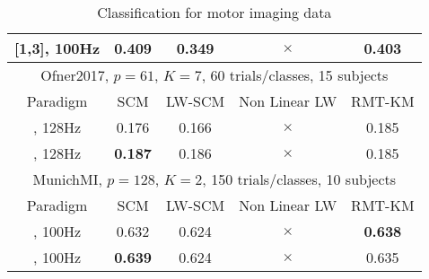 \begin{table*}[]
\begin{tabular}{||c||c|c|c|c||}
    [1,3], 100Hz & {\bf 0.409} & 0.349 & $\times$ & 0.403 \\
    \hline
    \hline
    \multicolumn{5}{|c|}{Ofner2017, $p=61$, $K=7$, 60 trials/classes, 15 subjects} \\
    \hline
    Paradigm & SCM & LW-SCM & Non Linear LW & RMT-KM \\
    \hline
    [0,3], 128Hz & 0.176 & 0.166 & $\times$ & 0.185 \\
    \hline
    [1,2], 128Hz & {\bf 0.187} & 0.186 & $\times$ & 0.185 \\
    \hline
    \hline
    \multicolumn{5}{|c|}{MunichMI, $p=128$, $K=2$, 150 trials/classes, 10 subjects} \\
    \hline
    Paradigm & SCM & LW-SCM & Non Linear LW & RMT-KM \\
    \hline
    [0,7], 100Hz & 0.632 & 0.624 & $\times$ & {\bf 0.638} \\
    \hline
    [2,5], 100Hz & {\bf 0.639} & 0.624 & $\times$ & 0.635 \\
    \hline
    \end{tabular}
    \caption{Classification for motor imaging data}
    \label{tab:my_label}
\end{table*}

